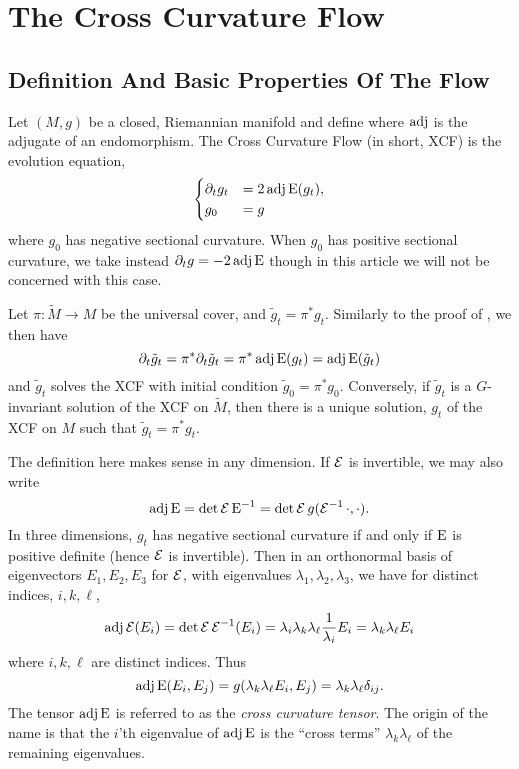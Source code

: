 \documentclass[a4paper,12pt]{amsart}
\begin{document}
\section{The Cross Curvature Flow}
\label{sec:xcf}
\subsection{Definition And Basic Properties Of The Flow}
\label{subsec:xcf_defn}

Let \((M, g)\) be a closed, Riemannian manifold and define
where $\operatorname{adj}$ is the adjugate of an endomorphism. The Cross Curvature Flow (in short, XCF) is the evolution equation,
\begin{equation}
\label{eq:xcf}
\begin{cases}
\partial_t g_t  &= 2 \operatorname{adj}\operatorname{E}(g_t), \\
g_0 &= g
\end{cases}
\end{equation}
where \(g_0\) has negative sectional curvature. When \(g_0\) has positive sectional curvature, we take instead \(\partial_t g = -2\operatorname{adj}\operatorname{E}\) though in this article we will not be concerned with this case.
\begin{rem}
Let \(\pi : \tilde{M} \to M\) be the universal cover, and \(\tilde{g}_t = \pi^{\ast} g_t\). Similarly to the proof of , we then have
\[
\partial_t \tilde{g}_t = \pi^{\ast} \partial_t \tilde{g}_t = \pi^{\ast} \operatorname{adj}\operatorname{E}(g_t) = \operatorname{adj}\operatorname{E}(\tilde{g}_t)
\]
and \(\tilde{g}_t\) solves the XCF with initial condition \(\tilde{g}_0 = \pi^{\ast} g_0\). Conversely, if \(\tilde{g}_t\) is a \(G\)-invariant solution of the XCF on \(\tilde{M}\), then there is a unique solution, \(g_t\) of the XCF on \(M\) such that \(\tilde{g}_t = \pi^{\ast} g_t\).
\end{rem}

The definition here makes sense in any dimension. If \(\operatorname{\mathcal{E}}\) is invertible, we may also write
\[
\operatorname{adj}\operatorname{E} = \det \operatorname{\mathcal{E}} \operatorname{E}^{-1} = \det\operatorname{\mathcal{E}} g(\operatorname{\mathcal{E}}^{-1} \cdot, \cdot).
\]
In three dimensions, \(g_t\) has negative sectional curvature if and only if \(\operatorname{E}\) is positive definite (hence \(\operatorname{\mathcal{E}}\) is invertible). Then in an orthonormal basis of eigenvectors \(E_1, E_2, E_3\) for \(\operatorname{\mathcal{E}}\), with eigenvalues \(\lambda_1, \lambda_2, \lambda_3\), we have for distinct indices, \(i, k, \ell\),
\[
\operatorname{adj}\operatorname{\mathcal{E}} (E_i) = \det\operatorname{\mathcal{E}} \operatorname{\mathcal{E}}^{-1}(E_i) = \lambda_i \lambda_k \lambda_{\ell} \frac{1}{\lambda_i} E_i = \lambda_k \lambda_{\ell} E_i
\]
where \(i,k,\ell\) are distinct indices. Thus
\begin{equation}
\label{eq:cross_curvature}
\operatorname{adj}\operatorname{E}(E_i, E_j) = g(\lambda_k \lambda_{\ell} E_i, E_j) = \lambda_k \lambda_{\ell} \delta_{ij}.
\end{equation}
The tensor \(\operatorname{adj}\operatorname{E}\) is referred to as the \emph{cross curvature tensor}. The origin of the name is that the \(i\)'th eigenvalue of \(\operatorname{adj}\operatorname{E}\) is the ``cross terms'' \(\lambda_k \lambda_{\ell}\) of the remaining eigenvalues.
\end{document}
